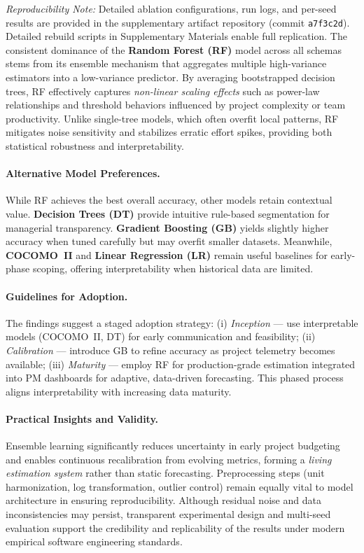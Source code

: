 \documentclass{ieeeaccess}
\begin{document}
\noindent
\textit{Reproducibility Note:} Detailed ablation configurations, run logs, 
and per-seed results are provided in the supplementary artifact repository 
(commit \texttt{a7f3c2d}). Detailed rebuild scripts in Supplementary Materials enable full replication.
The consistent dominance of the \textbf{Random Forest (RF)} model across all schemas 
stems from its ensemble mechanism that aggregates multiple high-variance estimators 
into a low-variance predictor.  
By averaging bootstrapped decision trees, RF effectively captures 
\textit{non-linear scaling effects} such as power-law relationships 
and threshold behaviors influenced by project complexity or team productivity.  
Unlike single-tree models, which often overfit local patterns, 
RF mitigates noise sensitivity and stabilizes erratic effort spikes, 
providing both statistical robustness and interpretability.  

\paragraph{Alternative Model Preferences.}
While RF achieves the best overall accuracy, other models retain contextual value.  
\textbf{Decision Trees (DT)} provide intuitive rule-based segmentation 
for managerial transparency.  
\textbf{Gradient Boosting (GB)} yields slightly higher accuracy 
when tuned carefully but may overfit smaller datasets.  
Meanwhile, \textbf{COCOMO~II} and \textbf{Linear Regression (LR)} remain 
useful baselines for early-phase scoping, 
offering interpretability when historical data are limited.  

\paragraph{Guidelines for Adoption.}
The findings suggest a staged adoption strategy:  
(i) \textit{Inception} — use interpretable models (COCOMO~II, DT) 
for early communication and feasibility;  
(ii) \textit{Calibration} — introduce GB to refine accuracy 
as project telemetry becomes available;  
(iii) \textit{Maturity} — employ RF for production-grade estimation 
integrated into PM dashboards for adaptive, data-driven forecasting.  
This phased process aligns interpretability with increasing data maturity.  

\paragraph{Practical Insights and Validity.}
Ensemble learning significantly reduces uncertainty in early project budgeting 
and enables continuous recalibration from evolving metrics, 
forming a \textit{living estimation system} rather than static forecasting.  
Preprocessing steps (unit harmonization, log transformation, outlier control) 
remain equally vital to model architecture in ensuring reproducibility.  
Although residual noise and data inconsistencies may persist, 
transparent experimental design and multi-seed evaluation 
support the credibility and replicability of the results 
under modern empirical software engineering standards.  
\end{document}
